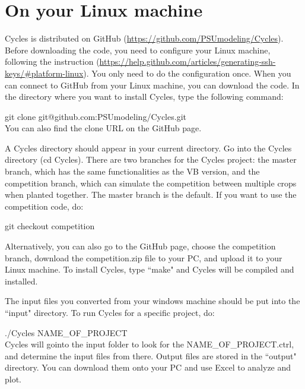 \documentclass[11pt]{article}
\begin{document}
\section{On your Linux machine}
Cycles is distributed on GitHub (\url{https://github.com/PSUmodeling/Cycles}).
Before downloading the code, you need to configure your Linux machine, following the instruction (\url{https://help.github.com/articles/generating-ssh-keys/#platform-linux}).
You only need to do the configuration once.
When you can connect to GitHub from your Linux machine, you can download the code.
In the directory where you want to install Cycles, type the following command:

git clone git@github.com:PSUmodeling/Cycles.git\\
You can also find the clone URL on the GitHub page.

A Cycles directory should appear in your current directory.
Go into the Cycles directory (cd Cycles).
There are two branches for the Cycles project:
the master branch, which has the same functionalities as the VB version, and the competition branch, which can simulate the competition between multiple crops when planted together.
The master branch is the default.
If you want to use the competition code, do:

git checkout competition

Alternatively, you can also go to the GitHub page, choose the competition branch, download the competition.zip file to your PC, and upload it to your Linux machine.
To install Cycles, type ``make" and Cycles will be compiled and installed.

The input files you converted from your windows machine should be put into the ``input" directory.
To run Cycles for a specific project, do:

./Cycles NAME\_OF\_PROJECT\\
Cycles will gointo the input folder to look for the NAME\_OF\_PROJECT.ctrl, and determine the input files from there.
Output files are stored in the ``output" directory.
You can download them onto your PC and use Excel to analyze and plot.
\end{document}
